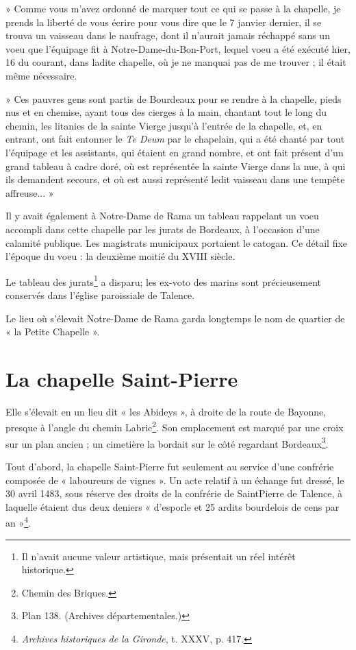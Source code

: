 » Comme vous m'avez ordonné de marquer tout ce qui se passe à la chapelle, je prends la liberté de vous écrire pour vous dire que le 7 janvier dernier, il se trouva un vaisseau dans le naufrage, dont il n'aurait jamais réchappé sans un voeu que l'équipage fit à Notre-Dame-du-Bon-Port, lequel voeu a été exécuté hier, 16 du courant, dans ladite chapelle, où je ne manquai pas de me trouver ; il était même nécessaire.

» Ces pauvres gens sont partis de Bourdeaux pour se rendre à la chapelle, pieds nus et en chemise, ayant tous des cierges à la main, chantant tout le long du chemin, les litanies de la sainte Vierge jusqu'à l'entrée de la chapelle, et, en entrant, ont fait entonner le \textit{Te Deum} par le chapelain, qui a été chanté par tout l'équipage et les assistants, qui étaient en grand nombre, et ont fait présent d'un grand tableau à cadre doré, où est représentée la sainte Vierge dans la nue, à qui ils demandent secours, et où est aussi représenté ledit vaisseau dans une tempête affreuse... »

Il y avait également à Notre-Dame de Rama un tableau rappelant un voeu accompli dans cette chapelle par les jurats de Bordeaux, à l'occasion d'une calamité publique. Les magistrats municipaux portaient le catogan. Ce détail fixe l'époque du voeu : la deuxième moitié du XVIII\ieme{} siècle.

Le tableau des jurats\footnote{Il n'avait aucune valeur artistique, mais présentait un réel intérêt historique.} a disparu; les ex-voto des marins sont précieusement conservés dans l'église paroissiale de Talence.

Le lieu où s'élevait Notre-Dame de Rama garda longtemps le nom de quartier de « la Petite Chapelle ».

\section{La chapelle Saint-Pierre}

Elle s'élevait en un lieu dit « les Abideys », à droite de la route de Bayonne, presque à l'angle du chemin Labric\footnote{Chemin des Briques.}. Son emplacement est marqué par une croix sur un plan ancien ; un cimetière la bordait sur le côté regardant Bordeaux\footnote{Plan 138. (Archives départementales.)}.

Tout d'abord, la chapelle Saint-Pierre fut seulement au service d'une confrérie composée de « laboureurs de vignes ». Un acte relatif à un échange fut dressé, le 30 avril 1483, sous réserve des droits de la confrérie de SaintPierre de Talence, à laquelle étaient dus deux deniers « d'esporle et 25 ardits bourdelois de cens par an »\footnote{\textit{Archives historiques de la Gironde}, t. XXXV, p. 417.}.

